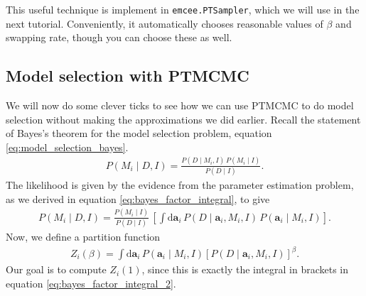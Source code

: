 This useful technique is implement in \texttt{emcee.PTSampler}, which
we will use in the next tutorial.  Conveniently, it automatically
chooses reasonable values of $\beta$ and swapping rate, though you can
choose these as well.


\subsection{Model selection with PTMCMC}
We will now do some clever ticks to see how we can use PTMCMC to do
model selection without making the approximations we did earlier.
Recall the statement of Bayes's theorem for the model selection
problem, equation \eqref{eq:model_selection_bayes}.
\begin{align}
P(M_i\mid D, I) = \frac{P(D\mid M_i, I)\,P(M_i\mid I)}{P(D\mid I)}.
\end{align}
The likelihood is given by the evidence from the parameter estimation
problem, as we derived in equation \eqref{eq:bayes_factor_integral},
to give
\begin{align}
P(M_i\mid D, I) = \frac{P(M_i\mid I)}{P(D\mid I)} \,
\left[\int \mathrm{d}\mathbf{a}_i\,P(D\mid \mathbf{a}_i, M_i, I)\,
P(\mathbf{a}_i\mid M_i, I)\right].
\label{eq:bayes_factor_integral_2}
\end{align}
Now, we define a partition function
\begin{align}
Z_i(\beta) = \int \mathrm{d}\mathbf{a}_i\,P(\mathbf{a}_i\mid M_i, I)
\left[P(D\mid \mathbf{a}_i, M_i, I)\right]^\beta.
\end{align}
Our goal is to compute $Z_i(1)$, since this is exactly the integral in
brackets in equation \eqref{eq:bayes_factor_integral_2}.

